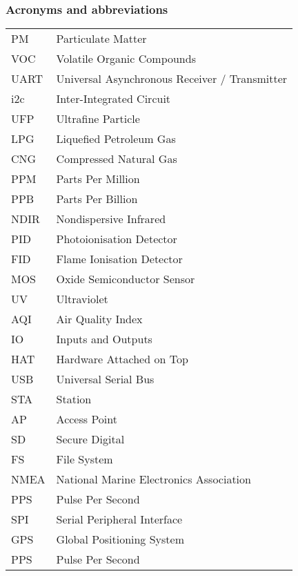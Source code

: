 \subsubsection*{Acronyms and abbreviations}

\begingroup
\renewcommand{\arraystretch}{1.2}
\begin{tabular}{@{}p{2.5cm} l}

	PM		& Particulate Matter\\
	VOC		& Volatile Organic Compounds\\
	UART	& Universal Asynchronous Receiver / Transmitter\\
	i2c		& Inter-Integrated Circuit\\
	UFP		& Ultrafine Particle\\
	LPG		& Liquefied Petroleum Gas\\
	CNG 	& Compressed Natural Gas\\
	PPM		& Parts Per Million\\
	PPB		& Parts Per Billion\\
	NDIR	& Nondispersive Infrared\\
	PID		& Photoionisation Detector\\
	FID		& Flame Ionisation Detector\\
	MOS		& Oxide Semiconductor Sensor\\
	UV		& Ultraviolet\\
	AQI		& Air Quality Index\\
	IO		& Inputs and Outputs\\
	HAT		& Hardware Attached on Top\\
	USB		& Universal Serial Bus\\
	STA		& Station\\
	AP		& Access Point\\
	SD		& Secure Digital\\
	FS		& File System\\
	NMEA	& National Marine Electronics Association\\
	PPS		& Pulse Per Second\\
	SPI		& Serial Peripheral Interface\\
	GPS		& Global Positioning System\\
	PPS		& Pulse Per Second\\
	
	
\end{tabular}
\endgroup
